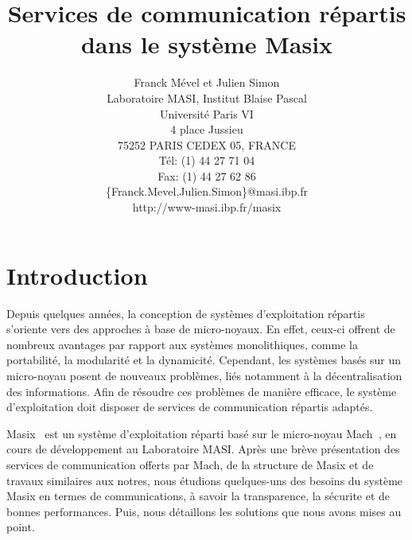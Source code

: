 

\title{Services de communication r\'epartis dans le syst\`eme Masix}

\newcommand {\figps} [4]
{
    \begin{figure} [ht]
       \begin{center}
                \leavevmode
                \epsfxsize=#2
                \epsfysize=#3
                \epsfbox {#1.ps}
                \caption {#4}
                \label {fig:#1}
        \end{center}
    \end{figure}
}


\author{
Franck M\'evel et Julien Simon\\
Laboratoire MASI, Institut Blaise Pascal\\
Universit\'e Paris VI\\
4 place Jussieu\\
75252 PARIS CEDEX 05, FRANCE\\
T\'el: (1) 44 27 71 04\\
Fax: (1) 44 27 62 86\\
\{Franck.Mevel,Julien.Simon\}@masi.ibp.fr\\
http://www-masi.ibp.fr/masix
}

\frenchspacing

\renewcommand{\baselinestretch}{2}



\maketitle

\section{Introduction}

Depuis quelques ann\'ees, la conception de syst\`emes d'exploitation r\'epartis
s'oriente vers des approches \`a base de micro-noyaux. En effet, ceux-ci offrent de nombreux avantages par rapport aux syst\`emes monolithiques, comme
la portabilit\'e, la modularit\'e et la dynamicit\'e. 
Cependant, les syst\`emes bas\'es sur un micro-noyau posent de nouveaux 
probl\`emes, li\'es notamment \`a la d\'ecentralisation des informations. 
Afin de r\'esoudre ces probl\`emes de mani\`ere efficace, le syst\`eme 
d'exploitation doit disposer de services de communication r\'epartis adapt\'es.

Masix~\cite{masix:osf} est un syst\`eme d'exploitation r\'eparti bas\'e sur le 
micro-noyau Mach~\cite{mach:foundation}, en cours de d\'eveloppement au 
Laboratoire MASI. Apr\`es une br\`eve pr\'esentation des services de 
communication offerts par Mach, de la structure de Masix et de travaux 
similaires aux notres, nous \'etudions quelques-uns des besoins du syst\`eme 
Masix en termes de communications, \`a savoir la transparence, la s\'ecurite 
et de bonnes performances. Puis, nous d\'etaillons les solutions que nous
 avons mises au point.

